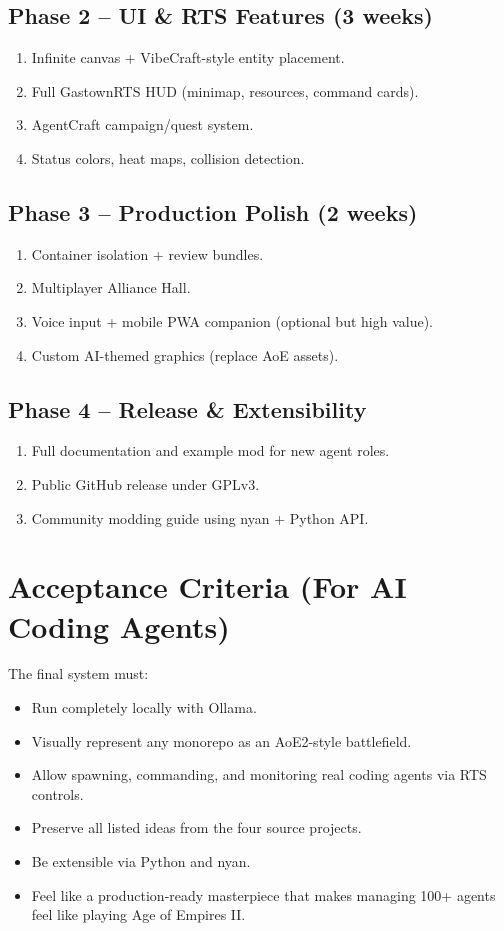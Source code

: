 \documentclass[11pt,a4paper]{article}
\begin{document}
\subsection{Phase 2 – UI \& RTS Features (3 weeks)}
\begin{enumerate}
    \item Infinite canvas + VibeCraft-style entity placement.
    \item Full GastownRTS HUD (minimap, resources, command cards).
    \item AgentCraft campaign/quest system.
    \item Status colors, heat maps, collision detection.
\end{enumerate}

\subsection{Phase 3 – Production Polish (2 weeks)}
\begin{enumerate}
    \item Container isolation + review bundles.
    \item Multiplayer Alliance Hall.
    \item Voice input + mobile PWA companion (optional but high value).
    \item Custom AI-themed graphics (replace AoE assets).
\end{enumerate}

\subsection{Phase 4 – Release \& Extensibility}
\begin{enumerate}
    \item Full documentation and example mod for new agent roles.
    \item Public GitHub release under GPLv3.
    \item Community modding guide using nyan + Python API.
\end{enumerate}

\section{Acceptance Criteria (For AI Coding Agents)}

The final system must:
\begin{itemize}
    \item Run completely locally with Ollama.
    \item Visually represent any monorepo as an AoE2-style battlefield.
    \item Allow spawning, commanding, and monitoring real coding agents via RTS controls.
    \item Preserve all listed ideas from the four source projects.
    \item Be extensible via Python and nyan.
    \item Feel like a production-ready masterpiece that makes managing 100+ agents feel like playing Age of Empires II.
\end{itemize}
\end{document}
